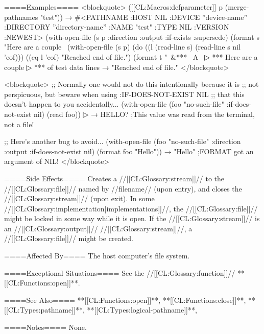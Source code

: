====Examples====
<blockquote> ([[CL:Macros:defparameter]] p (merge-pathnames "test")) → #<PATHNAME :HOST NIL :DEVICE ''device-name'' :DIRECTORY ''directory-name'' :NAME "test" :TYPE NIL :VERSION :NEWEST> (with-open-file (s p :direction :output :if-exists :supersede) (format s "Here are a couple~ (with-open-file (s p) (do ((l (read-line s) (read-line s nil 'eof))) ((eq l 'eof) "Reached end of file.") (format t "~&*** ~A~
▷ *** Here are a couple
▷ *** of test data lines → "Reached end of file." </blockquote>

<blockquote> ;; Normally one would not do this intentionally because it is ;; not perspicuous, but beware when using :IF-DOES-NOT-EXIST NIL ;; that this doesn't happen to you accidentally... (with-open-file (foo "no-such-file" :if-does-not-exist nil) (read foo))
▷  → HELLO? ;This value was read from the terminal, not a file!

;; Here's another bug to avoid... (with-open-file (foo "no-such-file" :direction :output :if-does-not-exist nil) (format foo "Hello")) → "Hello" ;FORMAT got an argument of NIL! </blockquote>

====Side Effects====
Creates a //[[CL:Glossary:stream]]// to the //[[CL:Glossary:file]]// named by //filename// (upon entry), and closes the //[[CL:Glossary:stream]]// (upon exit). In some //[[CL:Glossary:implementation|implementations]]//, the //[[CL:Glossary:file]]// might be locked in some way while it is open. If the //[[CL:Glossary:stream]]// is an //[[CL:Glossary:output]]// //[[CL:Glossary:stream]]//, a //[[CL:Glossary:file]]// might be created.

====Affected By====
The host computer's file system.

====Exceptional Situations====
See the //[[CL:Glossary:function]]// **[[CL:Functions:open]]**.

====See Also====
**[[CL:Functions:open]]**, **[[CL:Functions:close]]**, **[[CL:Types:pathname]]**, **[[CL:Types:logical-pathname]]**, {\secref\PathnamesAsFilenames}

====Notes====
None.

           

